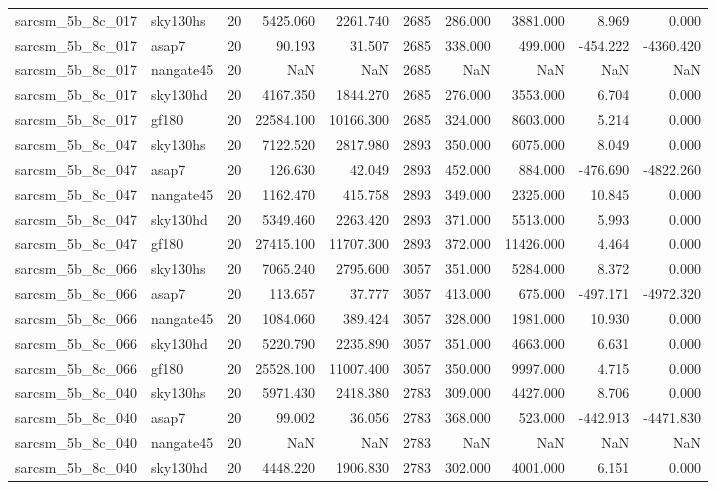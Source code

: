 \begin{longtable}{llrrrrrrrr}
sarcsm\_5b\_8c\_017 & sky130hs & 20 & 5425.060 & 2261.740 & 2685 & 286.000 & 3881.000 & 8.969 & 0.000 \\
sarcsm\_5b\_8c\_017 & asap7 & 20 & 90.193 & 31.507 & 2685 & 338.000 & 499.000 & -454.222 & -4360.420 \\
sarcsm\_5b\_8c\_017 & nangate45 & 20 & NaN & NaN & 2685 & NaN & NaN & NaN & NaN \\
sarcsm\_5b\_8c\_017 & sky130hd & 20 & 4167.350 & 1844.270 & 2685 & 276.000 & 3553.000 & 6.704 & 0.000 \\
sarcsm\_5b\_8c\_017 & gf180 & 20 & 22584.100 & 10166.300 & 2685 & 324.000 & 8603.000 & 5.214 & 0.000 \\
sarcsm\_5b\_8c\_047 & sky130hs & 20 & 7122.520 & 2817.980 & 2893 & 350.000 & 6075.000 & 8.049 & 0.000 \\
sarcsm\_5b\_8c\_047 & asap7 & 20 & 126.630 & 42.049 & 2893 & 452.000 & 884.000 & -476.690 & -4822.260 \\
sarcsm\_5b\_8c\_047 & nangate45 & 20 & 1162.470 & 415.758 & 2893 & 349.000 & 2325.000 & 10.845 & 0.000 \\
sarcsm\_5b\_8c\_047 & sky130hd & 20 & 5349.460 & 2263.420 & 2893 & 371.000 & 5513.000 & 5.993 & 0.000 \\
sarcsm\_5b\_8c\_047 & gf180 & 20 & 27415.100 & 11707.300 & 2893 & 372.000 & 11426.000 & 4.464 & 0.000 \\
sarcsm\_5b\_8c\_066 & sky130hs & 20 & 7065.240 & 2795.600 & 3057 & 351.000 & 5284.000 & 8.372 & 0.000 \\
sarcsm\_5b\_8c\_066 & asap7 & 20 & 113.657 & 37.777 & 3057 & 413.000 & 675.000 & -497.171 & -4972.320 \\
sarcsm\_5b\_8c\_066 & nangate45 & 20 & 1084.060 & 389.424 & 3057 & 328.000 & 1981.000 & 10.930 & 0.000 \\
sarcsm\_5b\_8c\_066 & sky130hd & 20 & 5220.790 & 2235.890 & 3057 & 351.000 & 4663.000 & 6.631 & 0.000 \\
sarcsm\_5b\_8c\_066 & gf180 & 20 & 25528.100 & 11007.400 & 3057 & 350.000 & 9997.000 & 4.715 & 0.000 \\
sarcsm\_5b\_8c\_040 & sky130hs & 20 & 5971.430 & 2418.380 & 2783 & 309.000 & 4427.000 & 8.706 & 0.000 \\
sarcsm\_5b\_8c\_040 & asap7 & 20 & 99.002 & 36.056 & 2783 & 368.000 & 523.000 & -442.913 & -4471.830 \\
sarcsm\_5b\_8c\_040 & nangate45 & 20 & NaN & NaN & 2783 & NaN & NaN & NaN & NaN \\
sarcsm\_5b\_8c\_040 & sky130hd & 20 & 4448.220 & 1906.830 & 2783 & 302.000 & 4001.000 & 6.151 & 0.000 \\

\end{longtable}
